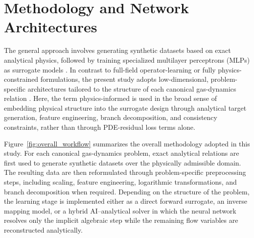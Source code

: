 \documentclass[preprint,12pt]{elsarticle}
\begin{document}
\section{Methodology and Network Architectures}
The general approach involves generating synthetic datasets based on exact analytical physics, followed by training specialized multilayer perceptrons (MLPs) as surrogate models \cite{Goodfellow}. In contrast to full-field operator-learning or fully physics-constrained formulations, the present study adopts low-dimensional, problem-specific architectures tailored to the structure of each canonical gas-dynamics relation \cite{DeepONet,FNO,PINO,KarniadakisReview}. Here, the term physics-informed is used in the broad sense of embedding physical structure into the surrogate design through analytical target generation, feature engineering, branch decomposition, and consistency constraints, rather than through PDE-residual loss terms alone.

Figure~\ref{fig:overall_workflow} summarizes the overall methodology adopted in this study. For each canonical gas-dynamics problem, exact analytical relations are first used to generate synthetic datasets over the physically admissible domain. The resulting data are then reformulated through problem-specific preprocessing steps, including scaling, feature engineering, logarithmic transformations, and branch decomposition when required. Depending on the structure of the problem, the learning stage is implemented either as a direct forward surrogate, an inverse mapping model, or a hybrid AI--analytical solver in which the neural network resolves only the implicit algebraic step while the remaining flow variables are reconstructed analytically.
\end{document}
